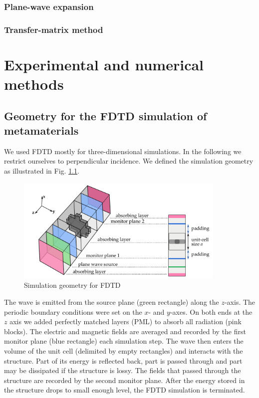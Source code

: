 \documentclass[letterpaper,12pt]{report}
\begin{document}
\subsection{Plane-wave expansion}


\subsection{Transfer-matrix method}




\chapter{Experimental and numerical methods}
\section{Geometry for the FDTD simulation of metamaterials}
We used FDTD mostly for three-dimensional simulations. In the following we restrict ourselves to perpendicular incidence.  We defined the simulation geometry as illustrated in Fig. \ref{fg_simgeom}.
\begin{figure}[ht] \caption{Simulation geometry for FDTD} \label{fg_simgeom} \centering 
	\includegraphics[width=10cm]{img/meep_geometry.pdf} 
\end{figure}

The wave is emitted from the source plane (green rectangle) along the $z$-axis. The periodic boundary conditions were set on the $x$- and $y$-axes. On both ends at the $z$ axis we added perfectly matched layers (PML) to absorb all radiation (pink blocks).  The electric and magnetic fields are averaged and recorded by the first monitor plane (blue rectangle) each simulation step. The wave then enters the volume of the unit cell (delimited by empty rectangles) and interacts with the structure. Part of its energy is reflected back, part is passed through and part may be dissipated if the structure is lossy. The fields that passed through the structure are recorded by the second monitor plane. After the energy stored in the structure drops to small enough level, the FDTD simulation is terminated.
\end{document}
